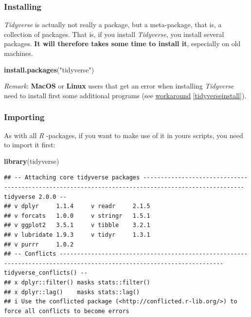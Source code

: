\documentclass[
]{scrartcl}
\newenvironment{Shaded}{\begin{snugshade}}{\end{snugshade}}
\newcommand{\FunctionTok}[1]{\textcolor[rgb]{0.13,0.29,0.53}{\textbf{#1}}}
\newcommand{\NormalTok}[1]{#1}
\newcommand{\StringTok}[1]{\textcolor[rgb]{0.31,0.60,0.02}{#1}}
\begin{document}
\subsubsection*{Installing}\label{installing}

\emph{Tidyverse} is actually not really a package, but a meta-package, that is, a collection of packages. That is, if you install \emph{Tidyverse}, you install several packages. \textbf{It will therefore takes some time to install it}, especially on old machines.

\begin{Shaded}
\begin{Highlighting}[]
\FunctionTok{install.packages}\NormalTok{(}\StringTok{"tidyverse"}\NormalTok{)}
\end{Highlighting}
\end{Shaded}

\emph{Remark}: \textbf{MacOS} or \textbf{Linux} users that get an error when installing \emph{Tidyverse} need to install first some additional programs (see \hyperref[tidyverseinstall]{workaround} \ref{tidyverseinstall}).

\subsubsection*{Importing}\label{importing}

As with all \emph{R} -packages, if you want to make use of it in yours scripts, you need to import it first:

\begin{Shaded}
\begin{Highlighting}[]
\FunctionTok{library}\NormalTok{(tidyverse)}
\end{Highlighting}
\end{Shaded}

\begin{verbatim}
## -- Attaching core tidyverse packages --------------------------------------------------------------------------------------------------- tidyverse 2.0.0 --
## v dplyr     1.1.4     v readr     2.1.5
## v forcats   1.0.0     v stringr   1.5.1
## v ggplot2   3.5.1     v tibble    3.2.1
## v lubridate 1.9.3     v tidyr     1.3.1
## v purrr     1.0.2     
## -- Conflicts --------------------------------------------------------------------------------------------------------------------- tidyverse_conflicts() --
## x dplyr::filter() masks stats::filter()
## x dplyr::lag()    masks stats::lag()
## i Use the conflicted package (<http://conflicted.r-lib.org/>) to force all conflicts to become errors
\end{verbatim}
\end{document}

